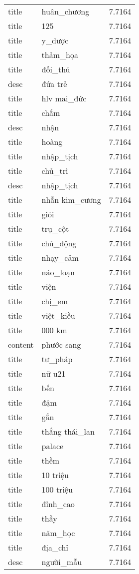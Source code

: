 \documentclass{article}
\begin{document}
\begin{tabular}{lll}
title & huân\_chương & 7.7164\\
title & 125 & 7.7164\\
title & y\_dược & 7.7164\\
title & thảm\_họa & 7.7164\\
title & đối\_thủ & 7.7164\\
desc & đứa trẻ & 7.7164\\
title & hlv mai\_đức & 7.7164\\
title & chấm & 7.7164\\
desc & nhận & 7.7164\\
title & hoàng & 7.7164\\
title & nhập\_tịch & 7.7164\\
title & chủ\_trì & 7.7164\\
desc & nhập\_tịch & 7.7164\\
title & nhẫn kim\_cương & 7.7164\\
title & giỏi & 7.7164\\
title & trụ\_cột & 7.7164\\
title & chủ\_động & 7.7164\\
title & nhạy\_cảm & 7.7164\\
title & náo\_loạn & 7.7164\\
title & viện & 7.7164\\
title & chị\_em & 7.7164\\
title & việt\_kiều & 7.7164\\
title & 000 km & 7.7164\\
content & phước sang & 7.7164\\
title & tư\_pháp & 7.7164\\
title & nữ u21 & 7.7164\\
title & bến & 7.7164\\
title & đậm & 7.7164\\
title & gắn & 7.7164\\
title & thắng thái\_lan & 7.7164\\
title & palace & 7.7164\\
title & thềm & 7.7164\\
title & 10 triệu & 7.7164\\
title & 100 triệu & 7.7164\\
title & đỉnh\_cao & 7.7164\\
title & thầy & 7.7164\\
title & năm\_học & 7.7164\\
title & địa\_chỉ & 7.7164\\
desc & người\_mẫu & 7.7164\\

\end{tabular}
\end{document}
